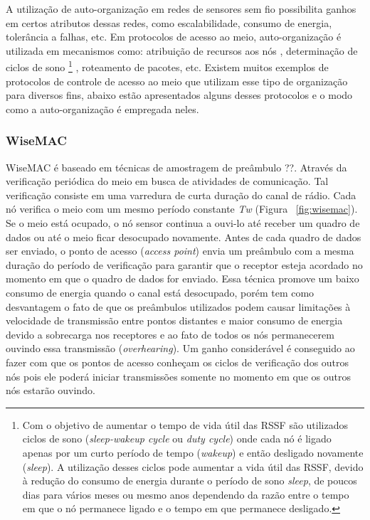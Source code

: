  A utilização de auto-organização em redes de sensores sem fio possibilita ganhos em certos atributos dessas redes, como escalabilidade, consumo de energia, tolerância a falhas, etc. Em protocolos de acesso ao meio, auto-organização é utilizada em mecanismos como: atribuição de recursos aos nós \cite{Dressler2008}, determinação de ciclos de sono%
 \footnote{Com o objetivo de aumentar o tempo de vida útil das RSSF são utilizados ciclos de sono (\textit{sleep-wakeup cycle} ou \textit{duty cycle}) onde cada nó é ligado apenas por um curto período de tempo (\textit{wakeup}) e então desligado novamente (\textit{sleep}). A utilização desses ciclos pode aumentar a vida útil das RSSF, devido à redução do consumo de energia durante o período de sono \textit{sleep}, de poucos dias para vários meses ou mesmo anos dependendo da razão entre o tempo em que o nó permanece ligado e o tempo em que permanece desligado.}
 \cite{Halkes:2005}, roteamento de pacotes, etc. Existem muitos exemplos de protocolos de controle de acesso ao meio que utilizam esse tipo de organização para diversos fins, abaixo estão apresentados alguns desses protocolos e o modo como a auto-organização é empregada neles.
 
 \subsubsection{WiseMAC}
 
 WiseMAC \cite{El-Hoiydi2004} é baseado em técnicas de amostragem de preâmbulo \cite{El-Hoiydi2002}??. Através da verificação periódica do meio em busca de atividades de comunicação. Tal verificação consiste em uma varredura de curta duração do canal de rádio. Cada nó verifica o meio com um mesmo período constante \textit{Tw} (Figura ~\ref{fig:wisemac}). Se o meio está ocupado, o nó sensor continua a ouvi-lo até receber um quadro de dados ou até o meio ficar desocupado novamente. Antes de cada quadro de dados ser enviado, o ponto de acesso (\textit{access point}) envia um preâmbulo com a mesma duração do período de verificação para garantir que o receptor esteja acordado no momento em que o quadro de dados for enviado. Essa técnica promove um baixo consumo de energia quando o canal está desocupado, porém tem como desvantagem o fato de que os preâmbulos utilizados podem causar limitações à velocidade de transmissão entre pontos distantes e maior consumo de energia devido a sobrecarga nos receptores e ao fato de todos os nós permanecerem ouvindo essa transmissão (\textit{overhearing}). Um ganho considerável é conseguido ao fazer com que os pontos de acesso conheçam os ciclos de verificação dos outros nós pois ele poderá iniciar transmissões somente no momento em que os outros nós estarão ouvindo.
 
